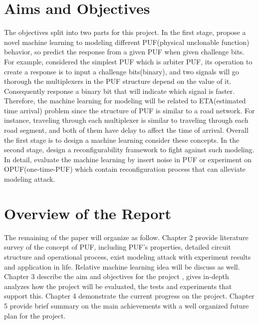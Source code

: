 \section{Aims and Objectives}
The objectives split into two parts for this project. In the first stage, propose a novel machine learning to modeling different PUF(physical unclonable function)
behavior, so predict the response from a given PUF when given challenge bits. For example, considered the simplest PUF which is arbiter PUF, its operation to create a response is to
input a challenge bits(binary), and two signals will go thorough the multiplexers in the PUF structure depend on the value of it. Consequently response a binary bit
that will indicate which signal is faster. Therefore, the machine learning for modeling will be related to ETA(estimated time arrival) problem since the structure of PUF is similar to a road network. 
For instance, traveling through each multiplexer is similar to traveling through each road segment, and both of them have delay to affect the time of arrival. Overall the first stage is to design a machine learning
consider these concepts. In the second stage, design a reconfigurability framework to fight against such modeling. In detail, evaluate the machine learning by insert noise in PUF or experiment on OPUF(one-time-PUF) which
contain reconfiguration process that can alleviate modeling attack.

\section{Overview of the Report}
The remaining of the paper will organize as follow. Chapter 2 provide literature survey of the concept of PUF, including PUF's properties, detailed circuit structure and operational process, 
exist modeling attack with experiment results and application in life. Relative machine learning idea will be discuss as well. Chapter 3 describe the aim and objectives for the project
, gives in-depth analyzes how the project will be evaluated, the tests and experiments that support this. Chapter 4 demonstrate the current progress on the project. Chapter 5 provide brief
summary on the main achievements with a well organized future plan for the project.
